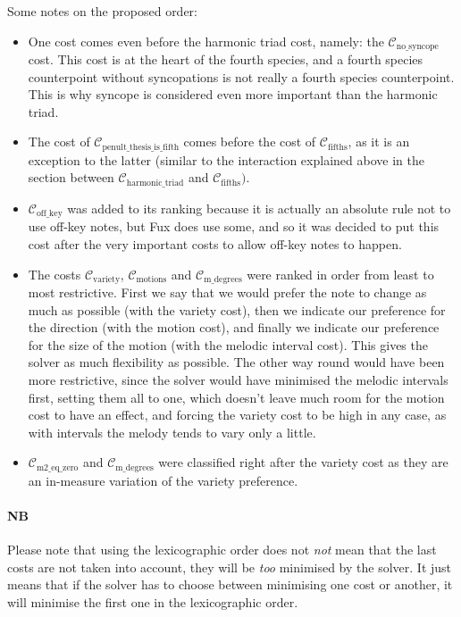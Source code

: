 Some notes on the proposed order: 
\begin{itemize}
    \item One cost comes even before the harmonic triad cost, namely: the $\mathcal{C}_\text{no\_syncope}$ cost. This cost is at the heart of the fourth species, and a fourth species counterpoint without syncopations is not really a fourth species counterpoint. This is why syncope is considered even more important than the harmonic triad.
    \item The cost of $\mathcal{C}_\text{penult\_thesis\_is\_fifth}$ comes before the cost of $\mathcal{C}_\text{fifths}$, as it is an exception to the latter (similar to the interaction explained above in the section between $\mathcal{C}_\text{harmonic\_triad}$ and $\mathcal{C}_\text{fifths})$.
    
    \item $\mathcal{C}_\text{off\_key}$ was added to its ranking because it is actually an absolute rule not to use off-key notes, but Fux does use some, and so it was decided to put this cost after the very important costs to allow off-key notes to happen.

    \item The costs $\mathcal{C}_\text{variety}$, $\mathcal{C}_\text{motions}$ and $\mathcal{C}_\text{m\_degrees}$ were ranked in order from least to most restrictive. First we say that we would prefer the note to change as much as possible (with the variety cost), then we indicate our preference for the direction (with the motion cost), and finally we indicate our preference for the size of the motion (with the melodic interval cost). This gives the solver as much flexibility as possible. The other way round would have been more restrictive, since the solver would have minimised the melodic intervals first, setting them all to one, which doesn't leave much room for the motion cost to have an effect, and forcing the variety cost to be high in any case, as with  intervals the melody tends to vary only a little.
    
    \item $\mathcal{C}_\text{m2\_eq\_zero}$ and $\mathcal{C}_\text{m\_degrees}$ were classified right after the variety cost as they are an in-measure variation of the variety preference.

\end{itemize}


\paragraph{NB} Please note that using the lexicographic order does not \textit{not} mean that the last costs are not taken into account, they will be \textit{too} minimised by the solver. It just means that if the solver has to choose between minimising one cost or another, it will minimise the first one in the lexicographic order. 

